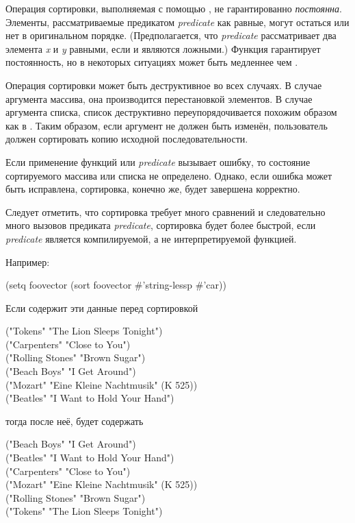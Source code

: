 \begin{defun}[Функция]
Операция сортировки, выполняемая с помощью , не гарантированно
\emph{постоянна}.
Элементы, рассматриваемые предикатом \emph{predicate} как равные, могут остаться
или нет в оригинальном порядке.
(Предполагается, что \emph{predicate} рассматривает два элемента \emph{x} и
\emph{y} равными, если 
 и
 являются ложными.)
Функция  гарантирует постоянность, но в некоторых ситуациях
может быть медленнее чем .

Операция сортировки может быть деструктивное во всех случаях. В случае аргумента
массива, она производится перестановкой элементов.
В случае аргумента списка, список деструктивно переупорядочивается похожим
образом как в .
Таким образом, если аргумент не должен быть изменён, пользователь должен
сортировать копию исходной последовательности.

Если применение функций  или \emph{predicate} вызывает ошибку, то
состояние сортируемого массива или списка не определено.
Однако, если ошибка может быть исправлена, сортировка, конечно же, будет
завершена корректно.

Следует отметить, что сортировка требует много сравнений и следовательно много
вызовов предиката \emph{predicate}, сортировка будет более быстрой, если
\emph{predicate} является компилируемой, а не интерпретируемой функцией.

Например:
\begin{lisp}
(setq foovector (sort foovector \#'string-lessp  \#'car))
\end{lisp}
Если  содержит эти данные перед сортировкой
\begin{lisp}
("Tokens" "The Lion Sleeps Tonight") \\
("Carpenters" "Close to You") \\
("Rolling Stones" "Brown Sugar") \\
("Beach Boys" "I Get Around") \\
("Mozart" "Eine Kleine Nachtmusik" (K 525)) \\
("Beatles" "I Want to Hold Your Hand")
\end{lisp}
тогда после неё,  будет содержать
\begin{lisp}
("Beach Boys" "I Get Around") \\
("Beatles" "I Want to Hold Your Hand") \\
("Carpenters" "Close to You") \\
("Mozart" "Eine Kleine Nachtmusik" (K 525)) \\
("Rolling Stones" "Brown Sugar") \\
("Tokens" "The Lion Sleeps Tonight")
\end{lisp}
\end{defun}

